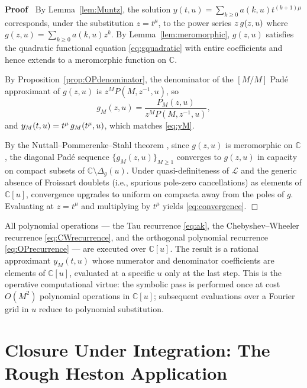 \documentclass{article}
\newenvironment{proof}{\noindent\textbf{Proof\ }}{\hspace*{\fill}$\Box$\medskip}
\newcommand{\C}{\mathbb{C}}
\newcommand{\Lk}{\mathcal{L}}
\begin{document}
\begin{proof}
  By  Lemma~\ref{lem:Muntz}, the solution $y (t, u) = \sum_{k \ge 0} a (k, u)
  t^{(k + 1) \mu}$ corresponds, under the substitution $z = t^{\mu}$, to the
  power series $z \hspace{0.17em} g (z, u)$ where $g (z, u) = \sum_{k \ge 0} a
  (k, u) z^k$. By  Lemma~\ref{lem:meromorphic}, $g (z, u)$ satisfies the
  quadratic functional equation \eqref{eq:gquadratic} with entire coefficients
  and hence extends to a meromorphic function on $\C$.
  
  By  Proposition~\ref{prop:OPdenominator}, the denominator of the $[M / M]$
  Pad{\'e} approximant of $g (z, u)$ is $z^M P (M, z^{- 1}, u)$, so
  \[ g_M (z, u) = \frac{P_M (z, u)}{z^M P (M, z^{- 1}, u)}, \]
  and $y_M (t, u) = t^{\mu}  \hspace{0.17em} g_M (t^{\mu}, u)$, which matches
  \eqref{eq:yM}.
  
  By the Nuttall--Pommerenke--Stahl theorem {\cite{Stahl1997}}, since $g (z,
  u)$ is meromorphic on $\C$, the diagonal Pad{\'e} sequence $\{g_M (z,
  u)\}_{M \ge 1}$ converges to $g (z, u)$ in capacity on compact subsets of
  $\C \setminus \Delta_g (u)$. Under quasi-definiteness of $\Lk$ and the
  generic absence of Froissart doublets (i.e., spurious pole-zero
  cancellations) as elements of $\C [u]$, convergence upgrades to uniform on
  compacta away from the poles of $g$. Evaluating at $z = t^{\mu}$ and
  multiplying by $t^{\mu}$ yields \eqref{eq:convergence}.
\end{proof}

\begin{remark}
  All polynomial operations --- the Tau recurrence \eqref{eq:ak}, the
  Chebyshev--Wheeler recurrence \eqref{eq:CWrecurrence}, and the orthogonal
  polynomial recurrence \eqref{eq:OPrecurrence} --- are executed over $\C
  [u]$. The result is a rational approximant $y_M (t, u)$ whose numerator and
  denominator coefficients are elements of $\C [u]$, evaluated at a specific
  $u$ only at the last step. This is the operative computational virtue: the
  symbolic pass is performed once at cost $O (M^2)$ polynomial operations in
  $\C [u]$; subsequent evaluations over a Fourier grid in $u$ reduce to
  polynomial substitution.
\end{remark}

\section{Closure Under Integration: The Rough Heston
Application}\label{sec:roughHeston}
\end{document}

